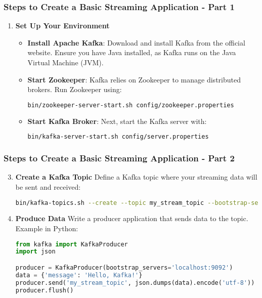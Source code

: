 \documentclass[aspectratio=169]{beamer}
\begin{document}
\begin{frame}[fragile]
    \frametitle{Steps to Create a Basic Streaming Application - Part 1}
    \begin{enumerate}
        \item \textbf{Set Up Your Environment}
        \begin{itemize}
            \item \textbf{Install Apache Kafka}: Download and install Kafka from the official website. Ensure you have Java installed, as Kafka runs on the Java Virtual Machine (JVM).
            \item \textbf{Start Zookeeper}: Kafka relies on Zookeeper to manage distributed brokers. Run Zookeeper using:
            \begin{lstlisting}[language=bash]
bin/zookeeper-server-start.sh config/zookeeper.properties
            \end{lstlisting}
            \item \textbf{Start Kafka Broker}: Next, start the Kafka server with:
            \begin{lstlisting}[language=bash]
bin/kafka-server-start.sh config/server.properties
            \end{lstlisting}
        \end{itemize}
    \end{enumerate}
\end{frame}

\begin{frame}[fragile]
    \frametitle{Steps to Create a Basic Streaming Application - Part 2}
    \begin{enumerate}
        \setcounter{enumi}{2}
        \item \textbf{Create a Kafka Topic}
        Define a Kafka topic where your streaming data will be sent and received:
        \begin{lstlisting}[language=bash]
bin/kafka-topics.sh --create --topic my_stream_topic --bootstrap-server localhost:9092 --partitions 1 --replication-factor 1
        \end{lstlisting}

        \item \textbf{Produce Data}
        Write a producer application that sends data to the topic. Example in Python:
        \begin{lstlisting}[language=python]
from kafka import KafkaProducer
import json

producer = KafkaProducer(bootstrap_servers='localhost:9092')
data = {'message': 'Hello, Kafka!'}
producer.send('my_stream_topic', json.dumps(data).encode('utf-8'))
producer.flush()
        \end{lstlisting}
    \end{enumerate}
\end{frame}
\end{document}

